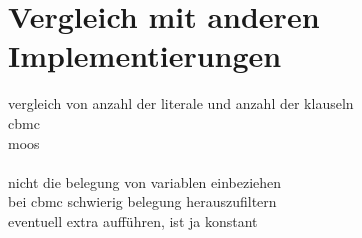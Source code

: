 \section{Vergleich mit anderen Implementierungen}


vergleich von anzahl der literale und anzahl der klauseln\\
cbmc\\
moos\\
~\\
nicht die belegung von variablen einbeziehen\\
bei cbmc schwierig belegung herauszufiltern\\
eventuell extra aufführen, ist ja konstant